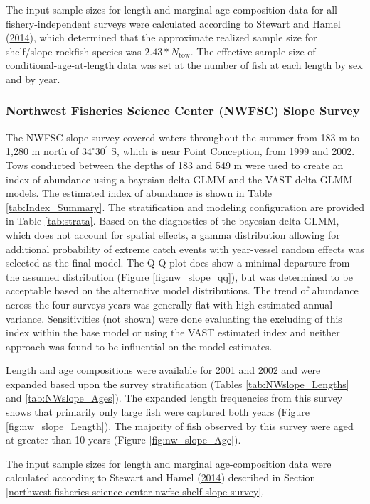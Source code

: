 \documentclass[12pt,]{article}
\begin{document}
The input sample sizes for length and marginal age-composition data for
all fishery-independent surveys were calculated according to Stewart and
Hamel (\protect\hyperlink{ref-stewart_bootstrapping_2014}{2014}), which
determined that the approximate realized sample size for shelf/slope
rockfish species was \(2.43*N_{\text{tow}}\). The effective sample size
of conditional-age-at-length data was set at the number of fish at each
length by sex and by year.

\subsubsection{Northwest Fisheries Science Center (NWFSC) Slope
Survey}\label{northwest-fisheries-science-center-nwfsc-slope-survey}

The NWFSC slope survey covered waters throughout the summer from 183 m
to 1,280 m north of \(34^\circ 30^\prime\) S, which is near Point
Conception, from 1999 and 2002. Tows conducted between the depths of 183
and 549 m were used to create an index of abundance using a bayesian
delta-GLMM and the VAST delta-GLMM models. The estimated index of
abundance is shown in Table \ref{tab:Index_Summary}. The stratification
and modeling configuration are provided in Table \ref{tab:strata}. Based
on the diagnostics of the bayesian delta-GLMM, which does not account
for spatial effects, a gamma distribution allowing for additional
probability of extreme catch events with year-vessel random effects was
selected as the final model. The Q-Q plot does show a minimal departure
from the assumed distribution (Figure \ref{fig:nw_slope_qq}), but was
determined to be acceptable based on the alternative model
distributions. The trend of abundance across the four surveys years was
generally flat with high estimated annual variance. Sensitivities (not
shown) were done evaluating the excluding of this index within the base
model or using the VAST estimated index and neither approach was found
to be influential on the model estimates.

Length and age compositions were available for 2001 and 2002 and were
expanded based upon the survey stratification (Tables
\ref{tab:NWslope_Lengths} and \ref{tab:NWslope_Ages}). The expanded
length frequencies from this survey shows that primarily only large fish
were captured both years (Figure \ref{fig:nw_slope_Length}). The
majority of fish observed by this survey were aged at greater than 10
years (Figure \ref{fig:nw_slope_Age}).

The input sample sizes for length and marginal age-composition data were
calculated according to Stewart and Hamel
(\protect\hyperlink{ref-stewart_bootstrapping_2014}{2014}) described in
Section
\ref{northwest-fisheries-science-center-nwfsc-shelf-slope-survey}.
\end{document}
